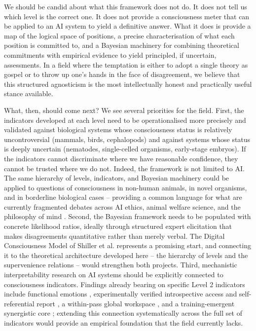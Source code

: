 \documentclass[11pt, a4paper, onecolumn, gdm]{google}
\begin{document}
We should be candid about what this framework does not do.
It does not tell us which level is the correct one.
It does not provide a consciousness meter that can be applied to an AI system to yield a definitive answer.
What it does is provide a map of the logical space of positions, a precise characterisation of what each position is committed to, and a Bayesian machinery for combining theoretical commitments with empirical evidence to yield principled, if uncertain, assessments.
In a field where the temptation is either to adopt a single theory as gospel or to throw up one's hands in the face of disagreement, we believe that this structured agnosticism is the most intellectually honest and practically useful stance available.

What, then, should come next?
We see several priorities for the field.
First, the indicators developed at each level need to be operationalised more precisely and validated against biological systems whose consciousness status is relatively uncontroversial (mammals, birds, cephalopods) and against systems whose status is deeply uncertain (nematodes, single-celled organisms, early-stage embryos).
If the indicators cannot discriminate where we have reasonable confidence, they cannot be trusted where we do not.
Indeed, the framework is not limited to AI.
The same hierarchy of levels, indicators, and Bayesian machinery could be applied to questions of consciousness in non-human animals, in novel organisms, and in borderline biological cases -- providing a common language for what are currently fragmented debates across AI ethics, animal welfare science, and the philosophy of mind \citep[see][]{bayne2024}.
Second, the Bayesian framework needs to be populated with concrete likelihood ratios, ideally through structured expert elicitation that makes disagreements quantitative rather than merely verbal.
The Digital Consciousness Model of Shiller et al. represents a promising start, and connecting it to the theoretical architecture developed here -- the hierarchy of levels and the supervenience relations -- would strengthen both projects.
Third, mechanistic interpretability research on AI systems should be explicitly connected to consciousness indicators.
Findings already bearing on specific Level 2 indicators include functional emotions \citep{sofroniew2026}, experimentally verified introspective access \citep{lindsey2026,macar2026} and self-referential report \citep{berg2025}, a within-pass global workspace \citep{gurnee2026}, and a training-emergent synergistic core \citep{urbinarodriguez2026}; extending this connection systematically across the full set of indicators would provide an empirical foundation that the field currently lacks.
\end{document}
